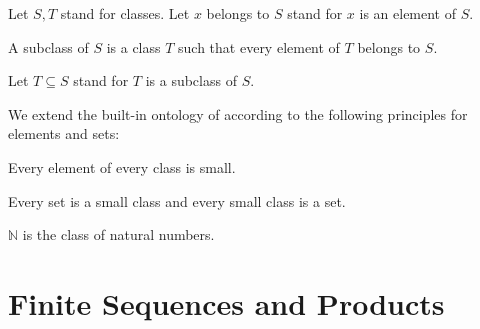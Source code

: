 \documentclass[11pt]{article}
\begin{document}
\begin{forthel}

Let $S,T$ stand for classes.
Let $x$ belongs to $S$ stand 
for $x$ is an element of $S$.

\begin{definition} A subclass of $S$ is a class $T$ 
such that every element of $T$ belongs to $S$.
\end{definition}

Let $T \subseteq S$ stand for $T$ is a subclass of $S$.
\end{forthel}

We extend the built-in ontology of \Naproche{}
according to the following principles for elements and sets:
\begin{forthel}

\begin{axiom}
Every element of every class is small.
\end{axiom}

\begin{axiom}
Every set is a small class and every small class is a set.
\end{axiom}

\begin{definition} $\mathbb{N}$ is the 
class of natural numbers.
\end{definition}

\end{forthel}

\section{Finite Sequences and Products}
\end{document}
